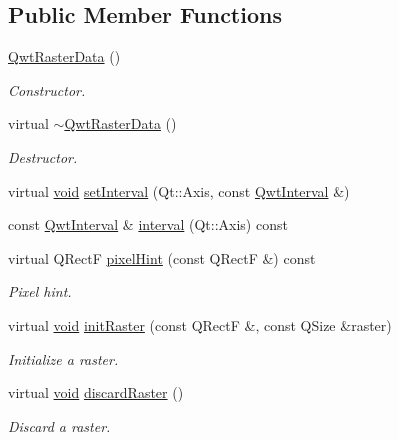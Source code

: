 \subsection*{Public Member Functions}
\begin{DoxyCompactItemize}
\item 
\hyperlink{class_qwt_raster_data_a0fc20e05a794c0dc85f6ae5719566588}{Qwt\-Raster\-Data} ()
\begin{DoxyCompactList}\small\item\em Constructor. \end{DoxyCompactList}\item 
virtual \hyperlink{class_qwt_raster_data_a95b24c7cad42c5f7947e64e990def3e8}{$\sim$\-Qwt\-Raster\-Data} ()
\begin{DoxyCompactList}\small\item\em Destructor. \end{DoxyCompactList}\item 
virtual \hyperlink{group___u_a_v_objects_plugin_ga444cf2ff3f0ecbe028adce838d373f5c}{void} \hyperlink{class_qwt_raster_data_a14abf60573989e2a2c97e21a98aee558}{set\-Interval} (Qt\-::\-Axis, const \hyperlink{class_qwt_interval}{Qwt\-Interval} \&)
\item 
const \hyperlink{class_qwt_interval}{Qwt\-Interval} \& \hyperlink{class_qwt_raster_data_a8423d051697f975150b3b555bfcac8b9}{interval} (Qt\-::\-Axis) const 
\item 
virtual Q\-Rect\-F \hyperlink{class_qwt_raster_data_ad1ce58351804760d1ba1e7efe97d39d6}{pixel\-Hint} (const Q\-Rect\-F \&) const 
\begin{DoxyCompactList}\small\item\em Pixel hint. \end{DoxyCompactList}\item 
virtual \hyperlink{group___u_a_v_objects_plugin_ga444cf2ff3f0ecbe028adce838d373f5c}{void} \hyperlink{class_qwt_raster_data_a64f5bf40b6138cc66719a56555c03589}{init\-Raster} (const Q\-Rect\-F \&, const Q\-Size \&raster)
\begin{DoxyCompactList}\small\item\em Initialize a raster. \end{DoxyCompactList}\item 
virtual \hyperlink{group___u_a_v_objects_plugin_ga444cf2ff3f0ecbe028adce838d373f5c}{void} \hyperlink{class_qwt_raster_data_a369a5f525814bf569e01f88fbd8ddb5b}{discard\-Raster} ()
\begin{DoxyCompactList}\small\item\em Discard a raster. \end{DoxyCompactList}\item 

\end{DoxyCompactItemize}
